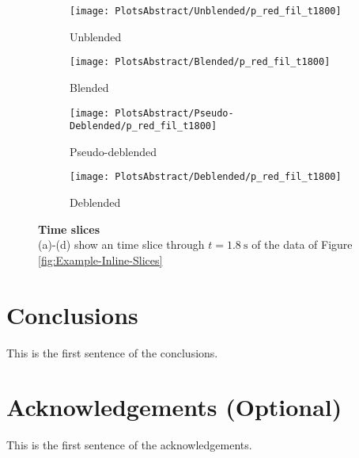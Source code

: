 \documentclass{madrid15WS}
\begin{document}
\begin{figure}
	\centering
	\begin{subfigure}[t]{0.4\textwidth}
		\centering
		\texttt{[image: PlotsAbstract/Unblended/p\_red\_fil\_t1800]}
		\caption{Unblended}
		\label{fig:Example-Unblendedt}
	\end{subfigure}
	\centering
	\begin{subfigure}[t]{0.4\textwidth}
		\centering
		\texttt{[image: PlotsAbstract/Blended/p\_red\_fil\_t1800]}
		\caption{Blended}
		\label{fig:Example-Blendedt}
	\end{subfigure}
	
	\centering
	\begin{subfigure}[t]{0.4\textwidth}
		\centering
		\texttt{[image: PlotsAbstract/Pseudo-Deblended/p\_red\_fil\_t1800]} %
		\caption{Pseudo-deblended}
		\label{fig:Example-Pseudot}
	\end{subfigure}
	\centering
	\begin{subfigure}[t]{0.4\textwidth}
		\centering
		\texttt{[image: PlotsAbstract/Deblended/p\_red\_fil\_t1800]} %
		\caption{Deblended}
		\label{fig:Example-Deblendedt}
	\end{subfigure}
		
	\caption{\textbf{Time slices}\\(a)-(d) show an time slice through $t = \SI{1.8}{\second}$ of the data of Figure \ref{fig:Example-Inline-Slices}}
	\label{fig:Example-Time-Slices}

\end{figure}



\section{Conclusions}

This is the first sentence of the conclusions.

\section{Acknowledgements (Optional)}

This is the first sentence of the acknowledgements.

%
%
% 


\end{document}
